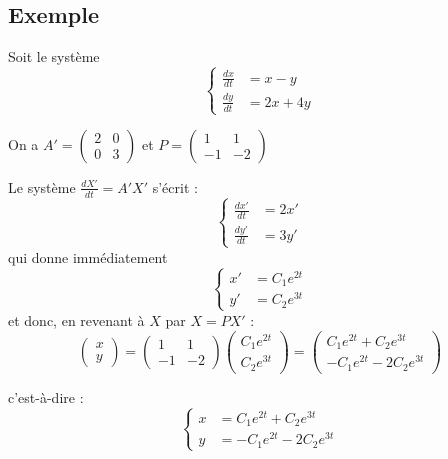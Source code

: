 \subsection*{Exemple}

Soit le système
\[
\left\{
\begin{aligned}
\frac{dx}{dt} &= x - y \\
\frac{dy}{dt} &= 2x + 4y
\end{aligned}
\right.
\]

On a \( A' = \begin{pmatrix} 2 & 0 \\ 0 & 3 \end{pmatrix} \) et 
\( P = \begin{pmatrix} 1 & 1 \\ -1 & -2 \end{pmatrix} \)

Le système \( \frac{dX'}{dt} = A'X' \) s’écrit :
\[
\left\{
\begin{aligned}
\frac{dx'}{dt} &= 2x' \\
\frac{dy'}{dt} &= 3y'
\end{aligned}
\right.
\]
qui donne immédiatement 
\[
\left\{
\begin{aligned}
x' &= C_1 e^{2t} \\
y' &= C_2 e^{3t}
\end{aligned}
\right.
\]
et donc, en revenant à \( X \) par \( X = PX' \) :
\[
\begin{pmatrix}
x \\
y
\end{pmatrix}
=
\begin{pmatrix}
1 & 1 \\
-1 & -2
\end{pmatrix}
\begin{pmatrix}
C_1 e^{2t} \\
C_2 e^{3t}
\end{pmatrix}
=
\begin{pmatrix}
C_1 e^{2t} + C_2 e^{3t} \\
- C_1 e^{2t} - 2C_2 e^{3t}
\end{pmatrix}
\]

c’est-à-dire :
\[
\left\{
\begin{aligned}
x &= C_1 e^{2t} + C_2 e^{3t} \\
y &= -C_1 e^{2t} - 2C_2 e^{3t}
\end{aligned}
\right.
\]

